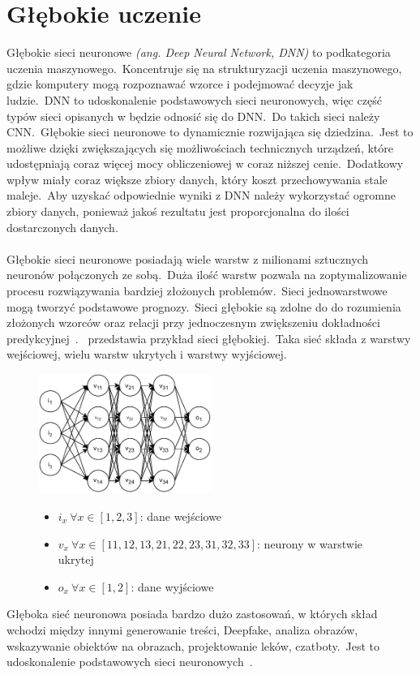 \section{Głębokie uczenie}
\label{sec:deeplearn}
Głębokie sieci neuronowe \textit{(ang. Deep Neural Network, DNN)} to podkategoria uczenia maszynowego.\ Koncentruje się na strukturyzacji uczenia maszynowego, gdzie komputery mogą rozpoznawać wzorce i podejmować decyzje jak ludzie.\ DNN to udoskonalenie podstawowych sieci neuronowych, więc część typów sieci opisanych w  będzie odnosić się do DNN.\ Do takich sieci należy CNN.\ Głębokie sieci neuronowe to dynamicznie rozwijająca się dziedzina.\ Jest to możliwe dzięki zwiększających się możliwościach technicznych urządzeń, które udostępniają coraz więcej mocy obliczeniowej w coraz niższej cenie.\ Dodatkowy wpływ miały coraz większe zbiory danych, który koszt przechowywania stale maleje.\ Aby uzyskać odpowiednie wyniki z DNN należy wykorzystać ogromne zbiory danych, ponieważ jakoś rezultatu jest proporcjonalna do ilości dostarczonych danych.
\\ \\
Głębokie sieci neuronowe posiadają wiele warstw z milionami sztucznych neuronów połączonych ze sobą.\ Duża ilość warstw pozwala na zoptymalizowanie procesu rozwiązywania bardziej złożonych problemów.\ Sieci jednowarstwowe mogą tworzyć podstawowe prognozy.\ Sieci głębokie są zdolne do do rozumienia złożonych wzorców oraz relacji przy jednoczesnym zwiększeniu dokładności predykcyjnej~\cite{Crabtree}.\  przedstawia przykład sieci głębokiej.\ Taka sieć składa z warstwy wejściowej, wielu warstw ukrytych i warstwy wyjściowej.

\begin{figure}[H]
    \centering
    \includegraphics[width=0.5\textwidth]{images/deep-neural-network}
    \begin{itemize}
        \item[] $i_x \  \forall x \in [1, 2, 3]$: dane wejściowe
        \item[] $v_x \ \forall x \in [11, 12, 13, 21, 22, 23, 31, 32, 33]$: neurony w warstwie ukrytej
        \item[] $o_x \ \forall x \in [1, 2]$: dane wyjściowe
    \end{itemize}
    \label{fig:deep-learn}
\end{figure}

Głęboka sieć neuronowa posiada bardzo dużo zastosowań, w których skład wchodzi między innymi generowanie treści, Deepfake, analiza obrazów, wskazywanie obiektów na obrazach, projektowanie leków, czatboty.\ Jest to udoskonalenie podstawowych sieci neuronowych~\cite{MicrosoftDeep2023}.